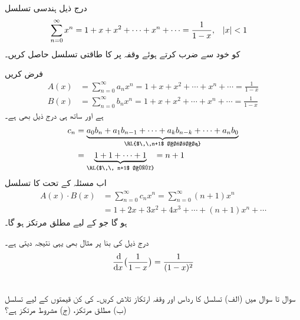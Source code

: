  درج ذیل ہندسی تسلسل
\begin{align*}
\sum_{n=0}^{\infty}x^n&=1+x+x^2+\cdots+x^n+\cdots=\frac{1}{1-x},&&\abs{x}<1
\end{align*}
کو خود سے ضرب کرتے ہوئے وقفہ  پر  کا طاقتی تسلسل حاصل کریں۔

فرض کریں
\begin{align*}
A(x)&=\sum_{n=0}^{\infty}a_nx^n=1+x+x^2+\cdots+x^n+\cdots=\frac{1}{1-x}\\
B(x)&=\sum_{n=0}^{\infty}b_nx^n=1+x+x^2+\cdots+x^n+\cdots=\frac{1}{1-x}
\end{align*}
ہے اور ساتھ ہی درج ذیل بھی ہے۔
\begin{align*}
c_n&=\underbrace{a_0b_n+a_1b_{n-1}+\cdots+a_kb_{n-k}+\cdots+a_nb_0}_{\text{\RL{$\,\,n+1$ اجزاء}}}\\
&=\underbrace{1+1+\cdots+1}_{\text{\RL{$\,\, n+1$ ایک}}}=n+1
\end{align*}
اب مسئلہ  کے تحت  کا تسلسل
\begin{align*}
A(x)\cdot B(x)&=\sum_{n=0}^{\infty}c_nx^n=\sum_{n=0}^{\infty}(n+1)x^n\\
&=1+2x+3x^2+4x^3+\cdots+(n+1)x^n+\cdots
\end{align*}
ہو گا جو  کے لیے  مطلق مرتکز ہو گا۔

درج ذیل کی  بنا پر مثال  بھی یہی نتیجہ دیتی ہے۔
\begin{align*}
\frac{\dif}{\dif x}\big(\frac{1}{1-x}\big)=\frac{1}{(1-x)^2}
\end{align*}

\\
سوال  تا سوال  میں (الف) تسلسل کا رداس اور وقفہ ارتکاز تلاش کریں۔   کی کن قیمتوں کے لیے تسلسل (ب) مطلق مرتکز، (ج) مشروط مرتکز ہے؟

